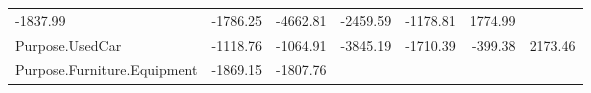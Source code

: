 \documentclass[]{article}
\begin{document}
\begin{longtable}[]{@{}lrrrrrr@{}}
\begin{minipage}[t]{0.10\columnwidth}
-1837.99\strut
\end{minipage} & \begin{minipage}[t]{0.08\columnwidth}\raggedleft\strut
-1786.25\strut
\end{minipage} & \begin{minipage}[t]{0.08\columnwidth}\raggedleft\strut
-4662.81\strut
\end{minipage} & \begin{minipage}[t]{0.08\columnwidth}\raggedleft\strut
-2459.59\strut
\end{minipage} & \begin{minipage}[t]{0.08\columnwidth}\raggedleft\strut
-1178.81\strut
\end{minipage} & \begin{minipage}[t]{0.08\columnwidth}\raggedleft\strut
1774.99\strut
\end{minipage}\tabularnewline
\begin{minipage}[t]{0.31\columnwidth}\raggedright\strut
Purpose.UsedCar\strut
\end{minipage} & \begin{minipage}[t]{0.10\columnwidth}\raggedleft\strut
-1118.76\strut
\end{minipage} & \begin{minipage}[t]{0.08\columnwidth}\raggedleft\strut
-1064.91\strut
\end{minipage} & \begin{minipage}[t]{0.08\columnwidth}\raggedleft\strut
-3845.19\strut
\end{minipage} & \begin{minipage}[t]{0.08\columnwidth}\raggedleft\strut
-1710.39\strut
\end{minipage} & \begin{minipage}[t]{0.08\columnwidth}\raggedleft\strut
-399.38\strut
\end{minipage} & \begin{minipage}[t]{0.08\columnwidth}\raggedleft\strut
2173.46\strut
\end{minipage}\tabularnewline
\begin{minipage}[t]{0.31\columnwidth}\raggedright\strut
Purpose.Furniture.Equipment\strut
\end{minipage} & \begin{minipage}[t]{0.10\columnwidth}\raggedleft\strut
-1869.15\strut
\end{minipage} & \begin{minipage}[t]{0.08\columnwidth}\raggedleft\strut
-1807.76\strut
\end{minipage} & \begin{minipage}[t]{0.08\columnwidth}\raggedleft\strut

\end{minipage}
\end{longtable}
\end{document}
